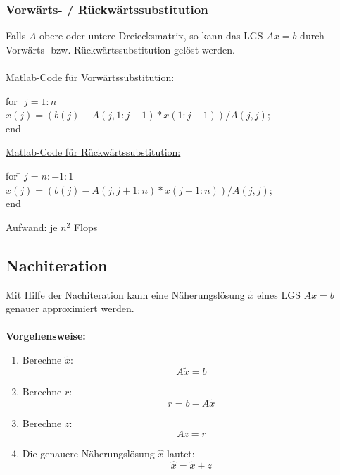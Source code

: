 \documentclass[a4paper,twocolumn,10pt]{article}
\begin{document}
\subsubsection{Vorwärts- / Rückwärtssubstitution}
Falls $A$ obere oder untere Dreiecksmatrix, so kann das LGS $Ax=b$ durch Vorwärts- bzw. Rückwärtssubstitution gelöst werden.\\\\
\underline{Matlab-Code für Vorwärtssubstitution:}
\begin{tabbing}
for \= $j=1:n$\\
\>$x(j)=(b(j)-A(j,1:j-1)*x(1:j-1))/A(j,j);$\\
end
\end{tabbing}
\underline{Matlab-Code für Rückwärtssubstitution:}
\begin{tabbing}
for \= $j=n:-1:1$\\
\>$x(j)=(b(j)-A(j,j+1:n)*x(j+1:n))/A(j,j);$\\
end
\end{tabbing}
Aufwand: je $n^2$ Flops

\subsection{Nachiteration}
Mit Hilfe der Nachiteration kann eine Näherungslösung $\tilde{x}$ eines LGS $Ax=b$ genauer approximiert werden.\\\\
\textbf{Vorgehensweise:}
\begin{enumerate}
\item Berechne $\tilde{x}$:
\begin{equation*}
A\tilde{x}=b
\end{equation*}
\item Berechne $r$:
\begin{equation*}
r=b-A\tilde{x}
\end{equation*}
\item Berechne $z$:
\begin{equation*}
Az=r
\end{equation*}
\item Die genauere Näherungslösung $\hat{x}$ lautet:
\begin{equation*}
\hat{x}=\tilde{x}+z
\end{equation*}
\end{enumerate}
\end{document}
